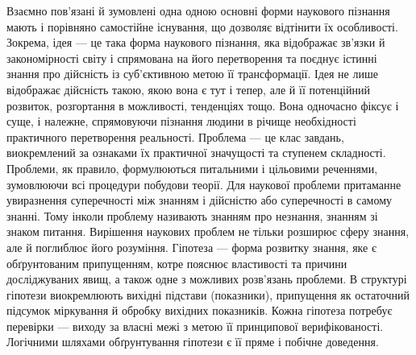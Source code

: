 Взаємно пов’язані й зумовлені одна одною основні форми наукового
пізнання мають і порівняно самостійне існування, що дозволяє відтінити їх
особливості. Зокрема, ідея --- це така форма наукового пізнання, яка відображає
зв’язки й закономірності світу і спрямована на його перетворення та поєднує
істинні знання про дійсність із суб’єктивною метою її трансформації. Ідея не
лише відображає дійсність такою, якою вона є тут і тепер, але й її потенційний
розвиток, розгортання в можливості, тенденціях тощо. Вона одночасно фіксує і
суще, і належне, спрямовуючи пізнання людини в річище необхідності
практичного перетворення реальності. Проблема --- це клас завдань,
виокремлений за ознаками їх практичної значущості та ступенем складності.
Проблеми, як правило, формулюються питальними і цільовими реченнями,
зумовлюючи всі процедури побудови теорії. Для наукової проблеми
притаманне увиразнення суперечності між знанням і дійсністю або
суперечності в самому знанні. Тому інколи проблему називають знанням про
незнання, знанням зі знаком питання. Вирішення наукових проблем не тільки
розширює сферу знання, але й поглиблює його розуміння. Гіпотеза --- форма
розвитку знання, яке є обґрунтованим припущенням, котре пояснює
властивості та причини досліджуваних явищ, а також одне з можливих
розв’язань проблеми. В структурі гіпотези виокремлюють вихідні підстави
(показники), припущення як остаточний підсумок міркування й обробку
вихідних показників. Кожна гіпотеза потребує перевірки --- виходу за власні
межі з метою її принципової верифікованості. Логічними шляхами
обґрунтування гіпотези є її пряме і побічне доведення.

